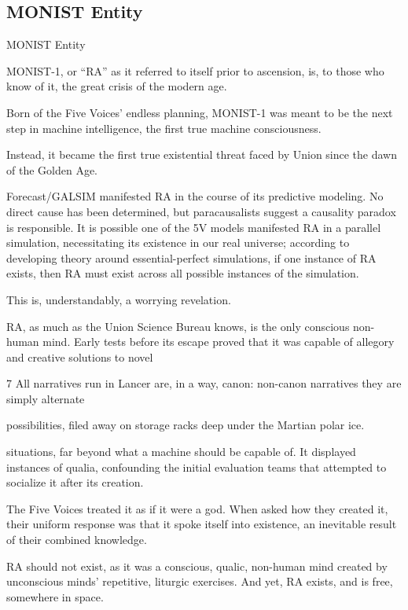 \subsection{MONIST Entity}
MONIST Entity   

MONIST-1, or “RA” as it referred to itself prior to ascension, is, to those who know of it, the great  
crisis of the modern age. 
 

Born of the Five Voices’ endless planning, MONIST-1 was meant to be the next step in machine  
intelligence, the first true machine consciousness. 
 

Instead, it became the first true existential threat faced by Union since the dawn of the Golden  
Age.
 

Forecast/GALSIM manifested RA in the course of its predictive modeling. No direct cause has  
been determined, but paracausalists suggest a causality paradox is responsible. It is possible  
one of the 5V models manifested RA in a parallel simulation, necessitating its existence in our  
real universe; according to developing theory around essential-perfect simulations, if one  
instance of RA exists, then RA must exist across all possible instances of the simulation. 
 

This is, understandably, a worrying revelation.      
 

RA, as much as the Union Science Bureau knows, is the only conscious non-human mind. Early  
tests before its escape proved that it was capable of allegory and creative solutions to novel  

7 All narratives run in Lancer are, in a way, canon: non-canon narratives they are simply alternate  

possibilities, filed away on storage racks deep under the Martian polar ice. 

                                                                                                                 


situations, far beyond what a machine should be capable of. It displayed instances of qualia,  
confounding the initial evaluation teams that attempted to socialize it after its creation. 
 

The Five Voices treated it as if it were a god. When asked how they created it, their uniform  
response was that it spoke itself into existence, an inevitable result of their combined knowledge.  
 

RA should not exist, as it was a conscious, qualic, non-human mind created by unconscious  
minds’ repetitive, liturgic exercises. And yet, RA exists, and is free, somewhere in space.  
 

